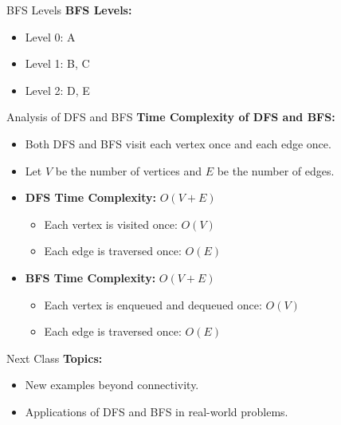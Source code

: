\documentclass{beamer}
\begin{document}
\begin{frame}{BFS Levels}
    \textbf{BFS Levels:}
    \begin{itemize}
        \item Level 0: A
        \item Level 1: B, C
        \item Level 2: D, E
    \end{itemize}

    \begin{center}
    \end{center}
\end{frame}

\begin{frame}{Analysis of DFS and BFS}
    \textbf{Time Complexity of DFS and BFS:}
    \begin{itemize}
        \item Both DFS and BFS visit each vertex once and each edge once.
        \item Let \( V \) be the number of vertices and \( E \) be the number of edges.

        \item \textbf{DFS Time Complexity:} \( O(V + E) \)
        \begin{itemize}
            \item Each vertex is visited once: \( O(V) \)
            \item Each edge is traversed once: \( O(E) \)
        \end{itemize}

        \item \textbf{BFS Time Complexity:} \( O(V + E) \)
        \begin{itemize}
            \item Each vertex is enqueued and dequeued once: \( O(V) \)
            \item Each edge is traversed once: \( O(E) \)
        \end{itemize}
    \end{itemize}
\end{frame}

\begin{frame}{Next Class}
    \textbf{Topics:}
    \begin{itemize}
        \item New examples beyond connectivity.
        \item Applications of DFS and BFS in real-world problems.
    \end{itemize}
\end{frame}
\end{document}
